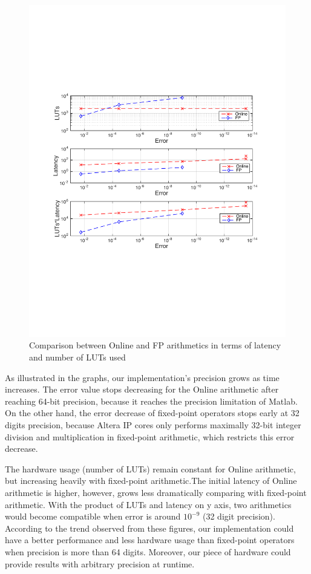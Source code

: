 \documentclass{sig-alternate}
\begin{document}
\begin{figure} [ht]
	\centering
	\includegraphics[scale=0.5]{figure101}
	\caption{Comparison between Online and FP arithmetics in terms of latency and number of LUTs used}
\end{figure}


As illustrated in the graphs, our implementation's precision grows as time increases. The error value stops decreasing for the Online arithmetic after reaching 64-bit precision, because it reaches the precision limitation of Matlab. On the other hand, the error decrease of fixed-point operators stops early at 32 digits precision, because Altera IP cores only performs maximally 32-bit integer division and multiplication in fixed-point arithmetic\cite{altera}, which restricts this error decrease.    

The hardware usage (number of LUTs) remain constant for Online arithmetic, but increasing heavily with fixed-point arithmetic.The initial latency of Online arithmetic is higher, however, grows less dramatically comparing with fixed-point arithmetic. With the product of LUTs and latency on y axis, two arithmetics would become compatible when error is around $10^{-9}$ (32 digit precision). According to the trend observed from these figures, our implementation could have a better performance and less hardware usage than fixed-point operators when precision is more than 64 digits. Moreover, our piece of hardware could provide results with arbitrary precision at runtime.
\end{document}
